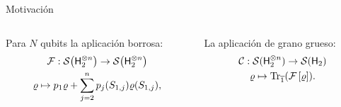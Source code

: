 \begin{frame}{Motivación}
    \begin{columns}
        \begin{column}{0.5\textwidth}
            Para $N$ qubits la aplicación borrosa\pause:
            \begin{equation}
                \begin{gathered}
                \mathcal{F}:\mathcal{S}\qty( {\sf H}_{2}^{\otimes n})\to \mathcal{S}\qty( {\sf H}_{2}^{\otimes n})\nonumber\\
                \varrho \mapsto p_{1}\varrho+\sum_{j=2}^{n}p_{j}(S_{1,j})\varrho(S_{1,j}),\nonumber
            \end{gathered}\nonumber
        \end{equation}
        \end{column}
        \pause
        \begin{column}{0.5\textwidth}
        La aplicación de grano grueso\pause:
        \begin{equation}
            \begin{gathered}
                \mathcal{C}:\mathcal{S}( {\sf H}_{2}^{\otimes n})\to \mathcal{S}({\sf H}_{2})\\
                \varrho\mapsto\Tr_{\overline{1}}(\mathcal{F}\left[\varrho\right]).
            \end{gathered}\nonumber
        \end{equation}
        \end{column}
    \end{columns}
\end{frame}


